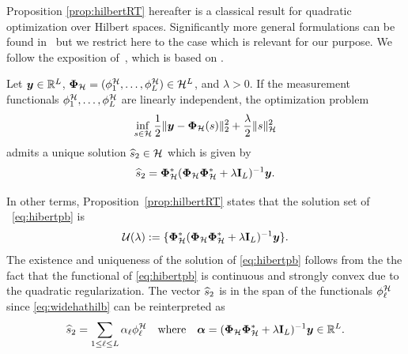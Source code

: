\documentclass[12pt]{article}
\begin{document}
   Proposition \ref{prop:hilbertRT} hereafter is a classical result for quadratic optimization over Hilbert spaces. Significantly more general formulations can be found in~\cite{Scholkopf2001generalized} but we restrict here to the case which is relevant for our purpose. We follow the exposition of~\cite[Theorem~7]{caponera2021nonparametric}, which is based on \cite[Section~3.2]{Unser2020}. 

    \begin{proposition}
    \label{prop:hilbertRT}
    Let $\bm{y}\in \mathbb{R}^L$, $\bm{\Phi}_\mathcal{H}= (\phi^\mathcal{H}_1 ,\ldots , \phi^\mathcal{H}_L) \in \mathcal{H}^L$, and $\lambda > 0$. If the measurement functionals $\phi^\mathcal{H}_1, \dots, \phi^\mathcal{H}_L$ are linearly independent, the optimization problem 
    \begin{equation} \label{eq:hibertpb}
        \inf_{s \in \mathcal{H}} \frac{1}{2} \| \bm{y} - \bm{\Phi}_\mathcal{H}(s) \|_2^2 + \frac{\lambda}{2} \| s \|_{\mathcal{H}}^2
    \end{equation}
    admits a unique solution $\widehat{s}_2 \in \mathcal{H}$ which is given by
    \begin{equation} \label{eq:widehathilb}
        \widehat{s}_2  = \bm{\Phi}_\mathcal{H}^* ( \bm{\Phi}_\mathcal{H} \bm{\Phi}_\mathcal{H}^* + \lambda \mathbf{I}_L)^{-1} \bm{y}.
    \end{equation}
    \end{proposition}
    
    \noindent In other terms, Proposition~\ref{prop:hilbertRT} states that the solution set of ~\eqref{eq:hibertpb} is 
    \begin{equation}
        \mathcal{U} (\lambda) := \{ \bm{\Phi}_\mathcal{H}^* ( \bm{\Phi}_\mathcal{H} \bm{\Phi}_\mathcal{H}^* + \lambda \mathbf{I}_L)^{-1} \bm{y}\}.
    \end{equation}
    The existence and uniqueness of the solution of \eqref{eq:hibertpb} follows from the the fact that the functional of \eqref{eq:hibertpb} is continuous and strongly convex due to the quadratic regularization.
    The vector $ \widehat{s}_2 $ is in the span of the functionals $\phi^\mathcal{H}_\ell$ since \eqref{eq:widehathilb} can be reinterpreted as 
    \begin{equation*}
    \widehat{s}_2  = \sum_{1 \leq \ell \leq L} \alpha_\ell \phi^\mathcal{H}_\ell \quad \text{where} \quad \bm{\alpha} = ( \bm{\Phi}_\mathcal{H} \bm{\Phi}_\mathcal{H}^* + \lambda \mathbf{I}_L)^{-1} \bm{y} \in \mathbb{R}^L. 
    \end{equation*}

    
\end{document}
